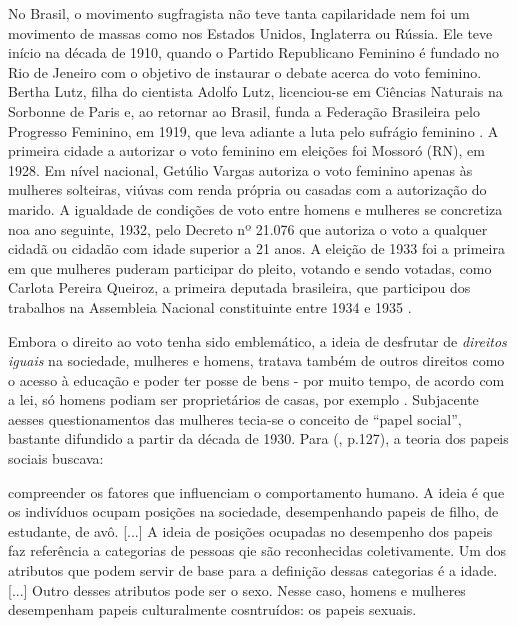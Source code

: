 No Brasil, o movimento sugfragista não teve tanta capilaridade nem foi um movimento de massas como nos Estados Unidos, Inglaterra ou Rússia. Ele teve início na década de 1910, quando o Partido Republicano Feminino é fundado no Rio de Jeneiro com o objetivo de instaurar o debate acerca do voto feminino. 
Bertha Lutz, filha do cientista Adolfo Lutz, licenciou-se em Ciências Naturais na Sorbonne de Paris e, ao retornar ao Brasil, funda a Federação Brasileira pelo Progresso Feminino, em 1919, que leva adiante a luta pelo sufrágio feminino \cite{PINSKY2003}. A primeira cidade a autorizar o voto feminino em eleições foi Mossoró (RN), em 1928. Em nível nacional, Getúlio Vargas autoriza o voto feminino apenas às mulheres solteiras, viúvas com renda própria ou casadas com a autorização do marido. A igualdade de condições de voto entre homens e mulheres se concretiza noa ano seguinte, 1932, pelo Decreto nº 21.076 que autoriza o voto a qualquer cidadã ou cidadão com idade superior a 21 anos.
A eleição de 1933 foi a primeira em que mulheres puderam participar do pleito, votando e sendo votadas, como Carlota Pereira Queiroz, a primeira deputada brasileira, que participou dos trabalhos na Assembleia Nacional constituinte entre 1934 e 1935 \cite{TABAK1989}.

Embora o direito ao voto tenha sido emblemático, a ideia de desfrutar de \emph{direitos iguais} na sociedade, mulheres e homens, tratava também de outros direitos como o acesso à educação e poder ter posse de bens - por muito tempo, de acordo com a lei, só homens podiam ser proprietários de casas, por exemplo \cite{PISCITELLI2009}. Subjacente aesses questionamentos das mulheres tecia-se o conceito de ``papel social'', bastante difundido a partir da década de 1930. Para  (\citeyear{PISCITELLI2009}, p.127), a teoria dos papeis sociais buscava:

\begin{citacao}
compreender os fatores que influenciam o comportamento humano. A ideia é que os indivíduos ocupam posições na sociedade, desempenhando papeis de filho, de estudante, de avô. [...] A ideia de posições ocupadas no desempenho dos papeis faz referência a categorias de pessoas qie são reconhecidas coletivamente. Um dos atributos que podem servir de base para a definição dessas categorias é a idade. [...] Outro desses atributos pode ser o sexo. Nesse caso, homens e mulheres desempenham papeis culturalmente cosntruídos: os papeis sexuais.
\end{citacao}

